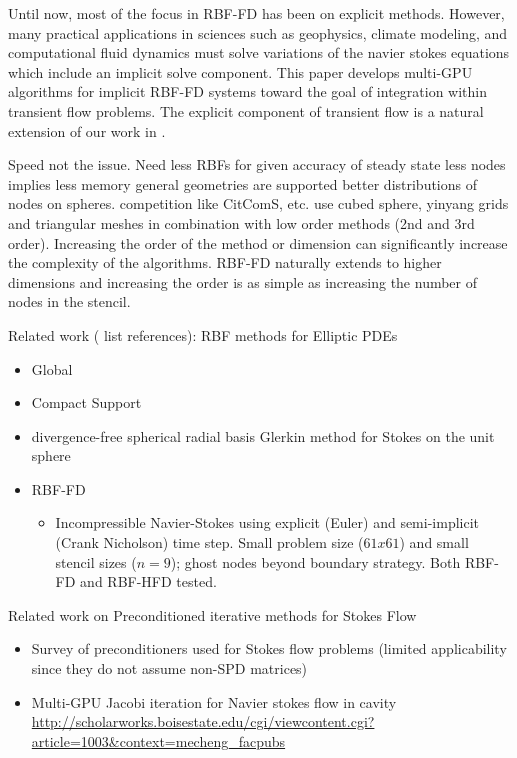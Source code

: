 Until now, most of the focus in RBF-FD has been on explicit methods. However, many practical applications in sciences such as geophysics, climate modeling, and computational fluid dynamics must solve variations of the navier stokes equations which include an implicit solve component. This paper develops multi-GPU algorithms for implicit RBF-FD systems toward the goal of integration within transient flow problems. The explicit component of transient flow is a natural extension of our work in \cite{Bollig2011}. 

Speed not the issue. 
Need less RBFs for given accuracy of steady state
less nodes implies less memory
general geometries are supported
better distributions of nodes on spheres. competition like CitComS, etc. use cubed sphere, yinyang grids and triangular meshes in combination with low order methods (2nd and 3rd order). Increasing the order of the method or dimension can significantly increase the complexity of the algorithms. RBF-FD naturally extends to higher dimensions and increasing the order is as simple as increasing the number of nodes in the stencil. 

Related work ({\color{blue} list references}): RBF methods for Elliptic PDEs
\begin{itemize} 
	\item Global \cite{Schmidt2009b} 
	\item Compact Support
	\item divergence-free spherical radial basis Glerkin method for Stokes on the unit sphere \cite{Ganesh2011} 
	\item RBF-FD	
	\begin{itemize} 
		\item Incompressible Navier-Stokes using explicit (Euler) and semi-implicit (Crank Nicholson) time step. Small problem size  ($61 x 61$) and small stencil sizes ($n=9$); ghost nodes beyond boundary strategy.  Both RBF-FD and RBF-HFD tested. \cite{Chinchapatnam2009}
		\end{itemize} 
\end{itemize} 

Related work on Preconditioned iterative methods for Stokes Flow
\begin{itemize}
\item Survey of preconditioners used for Stokes flow problems \cite{May2008} (limited applicability since they do not assume non-SPD matrices) 
\item Multi-GPU Jacobi iteration for Navier stokes flow in cavity \url{http://scholarworks.boisestate.edu/cgi/viewcontent.cgi?article=1003&context=mecheng_facpubs}
\end{itemize} 

